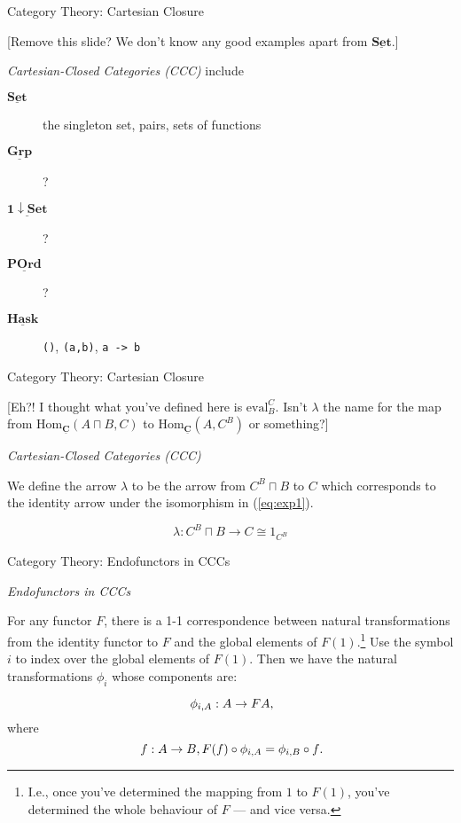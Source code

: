\documentclass[10pt]{beamer}
\newcommand{\Cat}[1]{\ensuremath{\underline{\mathbf{#1}}}}
\newcommand{\Hom}[3]{\ensuremath{\mathrm{Hom}_{\Cat{#1}}(#2,#3)}}
\newcommand{\Com}[3]{#3^{#2}}
\newcommand{\eqnlabel}[1]{\label{eq:#1}}
\newcommand{\eqnref}[1]{(\ref{eq:#1})}
\theoremstyle{definition}
\theoremstyle{remark}
\numberwithin{equation}{section}
\begin{document}
\begin{frame}[fragile]{Category Theory: Cartesian Closure}

  [Remove this slide? We don't know any good examples apart from $\Cat{Set}$.]
  
  \emph{Cartesian-Closed Categories (CCC)}
  include
  \begin{description}
    \item[\Cat{Set}] the singleton set, pairs, sets of functions
    \item[\Cat{Grp}] ?
    \item[\Cat{1\downarrow Set}] ?
    \item[\Cat{POrd}] ?
    \item[\Cat{Hask}] \lstinline{()}, \lstinline{(a,b)}, \lstinline{a -> b}
  \end{description}

\end{frame}

\begin{frame}[fragile]{Category Theory: Cartesian Closure}

  [Eh?! I thought what you've defined here is $\mathrm{eval}_B^C$. Isn't $\lambda$
the name for the map from $\Hom{C}{A\sqcap B}{C}$ to $\Hom{C}{A}{\Com{C}{B}{C}}
\eqnlabel{exp1}$ or something?]
  
  \emph{Cartesian-Closed Categories (CCC)}

  We define the arrow $\lambda$ to be the arrow from $\Com{C}{B}{C}\sqcap B$ to $C$ which corresponds to the identity arrow under the isomorphism in \eqnref{exp1}.

  \[
  \lambda : \Com{C}{B}{C}\sqcap B \rightarrow C \cong 1_{\Com{C}{B}{C}}
  \]

\end{frame}

\begin{frame}[fragile]{Category Theory: Endofunctors in CCCs}

  \emph{Endofunctors in CCCs}

  For any functor $F$, there is a 1-1 correspondence between natural
  transformations from the identity functor to $F$ and the global elements of
  $F(1)$.\footnote{I.e., once you've determined the mapping from $1$ to $F(1)$,
    you've determined the whole behaviour of $F$ --- and vice versa.} Use the
  symbol $i$ to index over the global elements of $F(1)$. Then we have the
  natural transformations $\phi_i$ whose components are:
  
  \[
  \phi_{i,A} : A \rightarrow F A\rlap{,}
  \]
  where
  \[
  f : A \rightarrow B, F(f) \circ \phi_{i,A} = \phi_{i,B} \circ f\rlap{.}
  \]

\end{frame}
\end{document}
